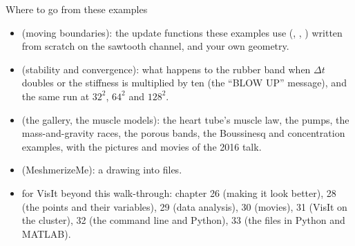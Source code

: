 \documentclass[aspectratio=169,11pt]{beamer}
\begin{document}
\begin{frame}{Where to go from these examples}
\label{fr:where}
\small
\begin{itemize}
  \item {} (moving boundaries): the update functions these examples use (, , ) written from scratch on the sawtooth channel, and your own geometry.
  \item {} (stability and convergence): what happens to the rubber band when $\Delta t$ doubles or the stiffness is multiplied by ten (the ``BLOW UP'' message), and the same run at $32^2$, $64^2$ and $128^2$.
  \item {} (the gallery, the muscle models): the heart tube's muscle law, the pumps, the mass-and-gravity races, the porous bands, the Boussinesq and concentration examples, with the pictures and movies of the 2016 talk.
  \item {} (MeshmerizeMe): a drawing into  files.
  \item {} for VisIt beyond this walk-through: chapter 26 (making it look better), 28 (the points and their variables), 29 (data analysis), 30 (movies), 31 (VisIt on the cluster), 32 (the command line and Python), 33 (the files in Python and MATLAB).
\end{itemize}
\end{frame}
\end{document}
